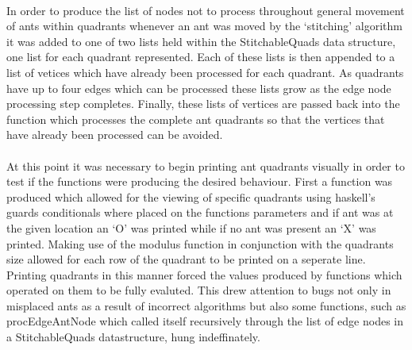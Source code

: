 \documentclass[main.tex]{subfiles}
\begin{document}
\paragraph{} In order to produce the list of nodes not to process throughout general movement of ants within quadrants whenever an ant was moved by the `stitching' algorithm it was added to one of two lists held within the StitchableQuads data structure, one list for each quadrant represented. Each of these lists is then appended to a list of vetices which have already been processed for each quadrant. As quadrants have up to four edges which can be processed these lists grow as the edge node processing step completes. Finally, these lists of vertices are passed back into the function which processes the complete ant quadrants so that the vertices that have already been processed can be avoided.

\paragraph{}At this point it was necessary to begin printing ant quadrants visually in order to test if the functions were producing the desired behaviour. First a function was produced which allowed for the viewing of specific quadrants using haskell's guards conditionals where placed on the functions parameters and if ant was at the given location an `O' was printed while if no ant was present an `X' was printed. Making use of the modulus function in conjunction with the quadrants size allowed for each row of the quadrant to be printed on a seperate line. Printing quadrants in this manner forced the values produced by functions which operated on them to be fully evaluted. This drew attention to bugs not only in misplaced ants as a result of incorrect algorithms but also some functions, such as procEdgeAntNode which called itself recursively through the list of edge nodes in a StitchableQuads datastructure, hung indeffinately.
\end{document}
